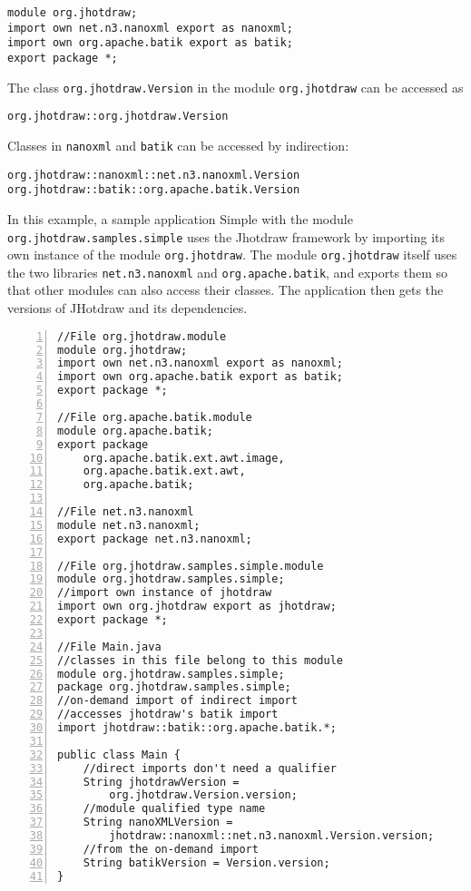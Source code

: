 \begin{lstlisting}
module org.jhotdraw;
import own net.n3.nanoxml export as nanoxml;
import own org.apache.batik export as batik;
export package *;
\end{lstlisting}

The class \texttt{org.jhotdraw.Version} in the module \texttt{org.jhotdraw}
can be accessed as
\begin{lstlisting}
org.jhotdraw::org.jhotdraw.Version
\end{lstlisting}
Classes in \texttt{nanoxml} and \texttt{batik} can be accessed by indirection:
\begin{lstlisting}
org.jhotdraw::nanoxml::net.n3.nanoxml.Version
org.jhotdraw::batik::org.apache.batik.Version
\end{lstlisting}

In this example, a sample application Simple with the module \texttt{org.jhotdraw.samples.simple}
uses the Jhotdraw framework by importing its own instance of the module
\texttt{org.jhotdraw}. The module \texttt{org.jhotdraw} itself uses the 
two libraries \texttt{net.n3.nanoxml} and \texttt{org.apache.batik}, and
exports them so that other modules can also access their classes. The 
application then gets the versions of JHotdraw and its dependencies.

\begin{lstlisting}[caption=Module Qualified Type References,numbers=left]
//File org.jhotdraw.module
module org.jhotdraw;
import own net.n3.nanoxml export as nanoxml;
import own org.apache.batik export as batik;
export package *;

//File org.apache.batik.module
module org.apache.batik;
export package 
	org.apache.batik.ext.awt.image,
	org.apache.batik.ext.awt,
	org.apache.batik;

//File net.n3.nanoxml
module net.n3.nanoxml;
export package net.n3.nanoxml;

//File org.jhotdraw.samples.simple.module
module org.jhotdraw.samples.simple;
//import own instance of jhotdraw
import own org.jhotdraw export as jhotdraw;
export package *;

//File Main.java
//classes in this file belong to this module
module org.jhotdraw.samples.simple;
package org.jhotdraw.samples.simple;
//on-demand import of indirect import
//accesses jhotdraw's batik import
import jhotdraw::batik::org.apache.batik.*;

public class Main {
	//direct imports don't need a qualifier
	String jhotdrawVersion = 
		org.jhotdraw.Version.version;
	//module qualified type name
	String nanoXMLVersion = 
		jhotdraw::nanoxml::net.n3.nanoxml.Version.version;
	//from the on-demand import
	String batikVersion = Version.version;
}
\end{lstlisting}


